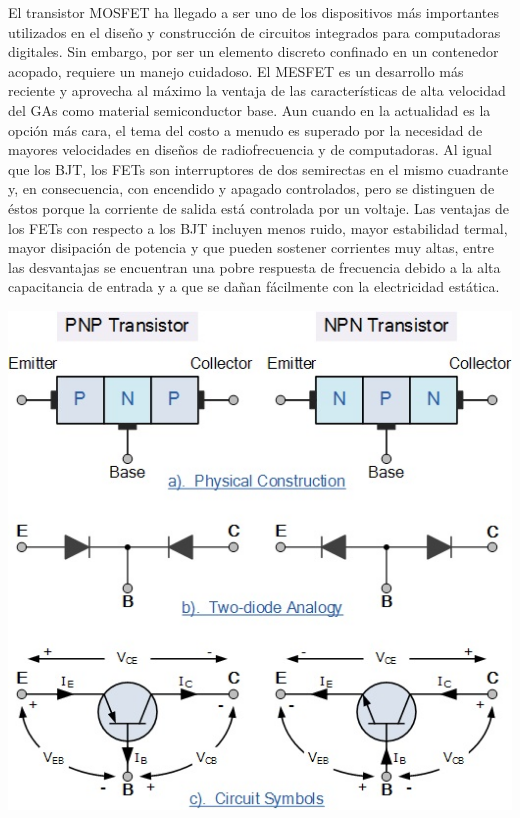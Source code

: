 \documentclass[12pt,a4paper]{article}
\begin{document}
\begin{flushleft}
\begin{center}
\end{center}
El transistor MOSFET ha llegado a ser uno de los dispositivos más importantes utilizados en el diseño y construcción de circuitos integrados para computadoras digitales. Sin embargo, por ser un elemento discreto confinado en un contenedor acopado, requiere un manejo cuidadoso. El MESFET es un desarrollo más reciente y aprovecha al máximo la ventaja de las características de alta velocidad del GAs como material semiconductor base. Aun cuando en la actualidad es la opción más cara, el tema del costo a menudo es superado por la necesidad de mayores velocidades en diseños de radiofrecuencia y de computadoras.\linebreak
Al igual que los BJT, los FETs son interruptores de dos semirectas en el mismo cuadrante y, en consecuencia, con encendido y apagado controlados, pero se distinguen de éstos porque la corriente de salida está controlada por un voltaje. Las ventajas de los FETs con respecto a los BJT incluyen menos ruido, mayor estabilidad termal, mayor disipación de potencia y que pueden sostener corrientes muy altas, entre las desvantajas se encuentran una pobre respuesta de frecuencia debido a la alta capacitancia de entrada y a que se dañan fácilmente con la electricidad estática.\linebreak
\begin{center}
\includegraphics[scale=1.0]{imagenes/jfet0.jpg}\linebreak
\end{center}
\end{flushleft}
\end{document}
